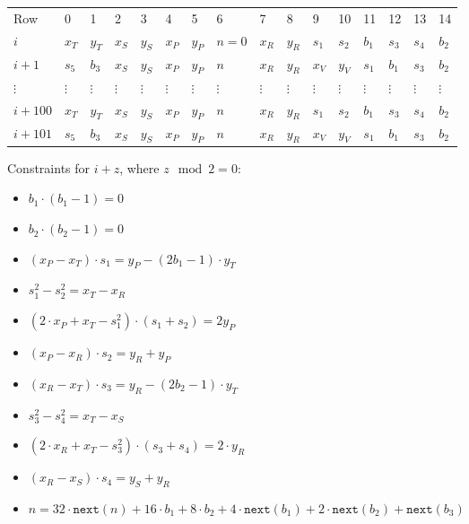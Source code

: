 \begin{center}
    \begin{table}[H]
        \begin{tabular}{llllllllllllllll}
            Row     & 0        & 1        & 2        & 3        & 4        & 5        & 6        & 7        & 8        & 9        & 10       & 11       & 12       & 13       & 14       \\
            $i$    & $x_T$    & $y_T$    & $x_S$    & $y_S$    & $x_P$    & $y_P$    & $n=0$    & $x_R$    & $y_R$    & $s_1$    & $s_2$    & $b_1$    & $s_3$ & $s_4$ & $b_2$ \\
            $i + 1$   & $s_5$    & $b_3$    & $x_S$    & $y_S$    & $x_P$    & $y_P$    & $n$      & $x_R$    & $y_R$    & $x_V$    & $y_V$    & $s_1$    & $b_1$ & $s_3$ & $b_2$ \\
            $\vdots$  & $\vdots$ & $\vdots$ & $\vdots$ & $\vdots$ & $\vdots$ & $\vdots$ & $\vdots$ & $\vdots$ & $\vdots$ & $\vdots$ & $\vdots$ & $\vdots$ & $\vdots$ & $\vdots$ & $\vdots$ \\
            $i + 100$ & $x_T$    & $y_T$    & $x_S$    & $y_S$    & $x_P$    & $y_P$    & $n$      & $x_R$    & $y_R$    & $s_1$    & $s_2$    & $b_1$ & $s_3$ & $s_4$ & $b_2$ \\
            $i + 101$ & $s_5$    & $b_3$    & $x_S$    & $y_S$    & $x_P$    & $y_P$    & $n$      & $x_R$    & $y_R$    & $x_V$    & $y_V$    & $s_1$ & $b_1$ & $s_3$ & $b_2$ \\
        \end{tabular}
    \end{table}
\end{center}

Constraints for $i + z$, where $z\mod 2 = 0$:
\begin{itemize}
    \item $b_1 \cdot (b_1 - 1) = 0$
    \item $b_2 \cdot (b_2 - 1) = 0$
    \item $(x_P - x_T) \cdot s_1 = y_P - (2b_1 - 1) \cdot y_T$
    \item $s_1^2 - s_2^2 = x_T - x_R$
    \item $(2 \cdot x_P + x_T - s_1^2) \cdot (s_1 + s_2) = 2y_P$
    \item $(x_P - x_R) \cdot s_2 = y_R + y_P$
    \item $(x_R - x_T) \cdot s_3 = y_R - (2b_2 - 1) \cdot y_T$
    \item $s_3^2 - s_4^2 = x_T - x_S$
    \item $(2 \cdot x_R + x_T - s_3^2) \cdot (s_3 + s_4) = 2 \cdot y_R$
    \item $(x_R - x_S) \cdot s_4 = y_S + y_R$
    \item $n = 32 \cdot \texttt{next}(n) + 16 \cdot b_1 + 8 \cdot b_2 + 4 \cdot \texttt{next}(b_1) + 2 \cdot \texttt{next}(b_2) + \texttt{next}(b_3)$
\end{itemize}

